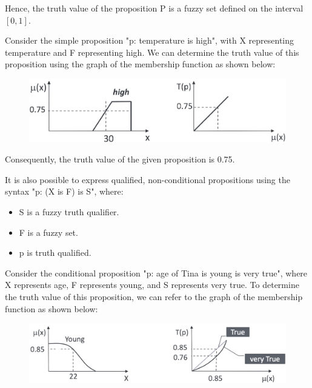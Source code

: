 \documentclass[12pt, a4paper]{report}
\begin{document}
    Hence, the truth value of the proposition P is a fuzzy set defined on the interval $[0,1]$.
    \begin{example}
        Consider the simple proposition "p: temperature is high", with X representing temperature and F representing high. 
        We can determine the truth value of this proposition using the graph of the membership function as shown below:        
        \begin{figure}[H]
            \centering
            \includegraphics[width=0.5\linewidth]{images/temperature.png}
        \end{figure}
        Consequently, the truth value of the given proposition is 0.75.
    \end{example}

    It is also possible to express qualified, non-conditional propositions using the syntax "p: (X is F) is S", where:
    \begin{itemize}
        \item S is a fuzzy truth qualifier.
        \item F is a fuzzy set.
        \item p is truth qualified.
    \end{itemize}
    \begin{example}
        Consider the conditional proposition "p: age of Tina is young is very true", where X represents age, F represents young, and S represents very true. 
        To determine the truth value of this proposition, we can refer to the graph of the membership function as shown below:
        \begin{figure}[H]
            \centering
            \includegraphics[width=0.75\linewidth]{images/age.png}
        \end{figure}
    \end{example}
\end{document}
